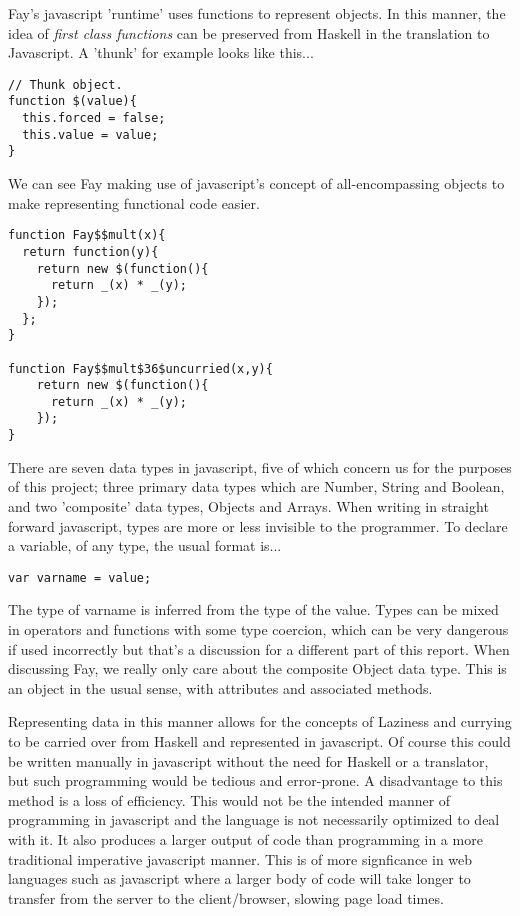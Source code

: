 \documentclass[11pt]{article}
\begin{document}
Fay's javascript 'runtime' uses functions to represent objects. In this manner,
the idea of \emph{first class functions} can be preserved from Haskell in the
translation to Javascript. A 'thunk' for example looks like this...
\begin{verbatim}
// Thunk object.
function $(value){
  this.forced = false;
  this.value = value;
}
\end{verbatim}
We can see Fay making use of javascript's concept of all-encompassing objects to
make representing functional code easier. 

\begin{verbatim}
function Fay$$mult(x){
  return function(y){
    return new $(function(){
      return _(x) * _(y);
    });
  };
}

function Fay$$mult$36$uncurried(x,y){
    return new $(function(){
      return _(x) * _(y);
    });
}
\end{verbatim}



There are seven data types in javascript, five of which concern us for the purposes
of this project; three primary data types which are Number, String and Boolean, 
and two 'composite' data types, Objects and Arrays. When writing in straight
forward javascript, types are more or less invisible to the programmer. To declare
a variable, of any type, the usual format is...
\begin{verbatim}
var varname = value;
\end{verbatim}
The type of varname is inferred from the type of the value. Types can be mixed
in operators and functions with some type coercion, which can be very dangerous
if used incorrectly but that's a discussion for a different part of this report.
When discussing Fay, we really only care about the composite Object data type. 
This is an object in the usual sense, with attributes and associated methods. 

Representing data in this manner allows for the concepts of Laziness and currying
to be carried over from Haskell and represented in javascript. Of course this could
be written manually in javascript without the need for Haskell or a translator, but
such programming would be tedious and error-prone. A disadvantage to this method is a 
loss of efficiency. This would not be the intended manner of programming in
javascript and the language is not necessarily optimized to deal with it. It
also produces a larger output of code than programming in a more traditional 
imperative javascript manner. This is of more signficance in web languages
such as javascript where a larger body of code will take longer to transfer
from the server to the client/browser, slowing page load times. 
\end{document}
